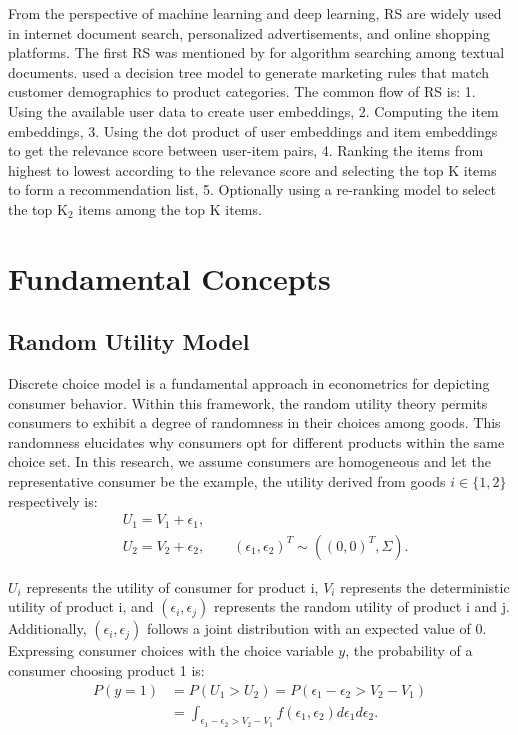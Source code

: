 \documentclass[12pt]{article}
\theoremstyle{definition}
\begin{document}
\begin{sloppypar}
From the perspective of machine learning and deep learning, RS are widely used in internet document search, personalized advertisements, and online shopping platforms. The first RS was mentioned by \textcite{1574231873785747328} for algorithm searching among textual documents. \textcite{5731f882-9c11-372e-a87e-2f3238e61d42} used a decision tree model to generate marketing rules that match customer demographics to product categories. The common flow of RS is: 1. Using the available user data to create user embeddings, 2. Computing the item embeddings, 3. Using the dot product of user embeddings and item embeddings to get the relevance score between user-item pairs, 4. Ranking the items from highest to lowest according to the relevance score and selecting the top K items to form a recommendation list, 5. Optionally using a re-ranking model to select the top $\mathrm{K}_2$ items among the top K items.

\section{Fundamental Concepts}
\subsection{Random Utility Model}
Discrete choice model is a fundamental approach in econometrics for depicting consumer behavior. Within this framework, the random utility theory permits consumers to exhibit a degree of randomness in their choices among goods. This randomness elucidates why consumers opt for different products within the same choice set. In this research, we assume consumers are homogeneous and let the representative consumer be the example, the utility derived from goods $i \in \{1, 2\}$ respectively is:
\begin{align*}
    &U_{1} = V_{1} + \epsilon_{1},\\
    &U_{2} = V_{2} + \epsilon_{2}, \qquad (\epsilon_{1}, \epsilon_{2})^T \sim ((0,0)^T, \Sigma).
\end{align*}

$U_{i}$ represents the utility of consumer for product i, $V_{i}$ represents the deterministic utility of product i, and $(\epsilon_{i}, \epsilon_{j})$ represents the random utility of product i and j. Additionally, $(\epsilon_{i}, \epsilon_{j})$ follows a joint distribution with an expected value of 0. Expressing consumer choices with the choice variable $y$, the probability of a consumer choosing product 1 is:
\begin{align*}
    P(y=1) &= P(U_{1} > U_{2}) = P(\epsilon_{1} - \epsilon_{2} > V_{2} - V_{1}) \\ 
    &= \int_{\epsilon_{1} - \epsilon_{2} > V_{2} - V_{1}} f(\epsilon_{1}, \epsilon_{2}) d\epsilon_{1} d\epsilon_{2}.
\end{align*}


\end{sloppypar}
\end{document}
